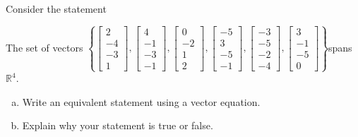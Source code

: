 
\begin{exerciseStatement}


Consider the statement 
\begin{center}\begin{minipage}{0.8\textwidth}
 The set of vectors \( \left\{ \left[\begin{array}{c}
2 \\
-4 \\
-3 \\
1
\end{array}\right] , \left[\begin{array}{c}
4 \\
-1 \\
-3 \\
-1
\end{array}\right] , \left[\begin{array}{c}
0 \\
-2 \\
1 \\
2
\end{array}\right] , \left[\begin{array}{c}
-5 \\
3 \\
-5 \\
-1
\end{array}\right] , \left[\begin{array}{c}
-3 \\
-5 \\
-2 \\
-4
\end{array}\right] , \left[\begin{array}{c}
3 \\
-1 \\
-5 \\
0
\end{array}\right] \right\} \)spans \(\mathbb{R}^4\). 
\end{minipage}\end{center}
    


\begin{enumerate}[(a)]
\item  Write an equivalent statement using a vector equation.
\item  Explain why your statement is true or false.
\end{enumerate}
    
\end{exerciseStatement}
    
